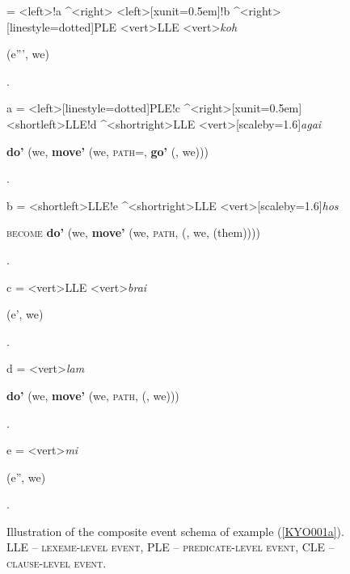 \begin{figure}
\! = {\stuff[a]}
<left>{\stuff[b]}!a ^<right>{\stuff[c]}
<left>[xunit=0.5em]{\stuff[d]}!b ^<right>[linestyle=dotted]{PLE}
<vert>{LLE}
<vert>{\textit{koh}}
{\begin{scriptsize} \textsc{} (e''', we)\end{scriptsize}}.

\!a = <left>[linestyle=dotted]{PLE}!c ^<right>[xunit=0.5em]{\stuff[e]}
<shortleft>{LLE}!d ^<shortright>{LLE}
<vert>[scaleby=1.6]{\textit{agai}}
{\begin{scriptsize} \textbf{do'} (we, \textbf{move'} (we, \textsc{path=}, \textbf{go'} (, we)))\end{scriptsize}}.

\!b = <shortleft>{LLE}!e ^<shortright>{LLE}
<vert>[scaleby=1.6]{\textit{hos}}
{\begin{scriptsize} \textsc{become} \textbf{do'} (we, \textbf{move'} (we, \textsc{path}, \textbf{} (, we, (them))))\end{scriptsize}}.

\!c = <vert>{LLE}
<vert>{\textit{brai}}
{\begin{scriptsize} \textsc{} (e', we)\end{scriptsize}}.

\!d = <vert>{\textit{lam}}
{\begin{scriptsize} \textbf{do'} (we, \textbf{move'} (we, \textsc{path}, \textbf{} (, we)))\end{scriptsize}}.

\!e = <vert>{\textit{mi}}
{\begin{scriptsize} \textsc{} (e'', we)\end{scriptsize}}.

\endjtree

\caption[Event schema illustration of example (\ref{KYO001a})]{Illustration of the composite event schema of example (\ref{KYO001a}). LLE -- \textsc{lexeme-level event}, PLE -- \textsc{predicate-level event}, CLE -- \textsc{clause-level event}.}
\label{figure:eventschema_KYO001a}
\end{figure}

